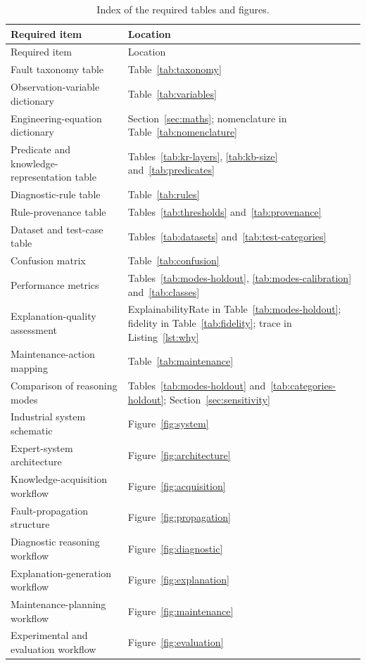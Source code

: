 \begin{small}
\begin{longtable}{L{5.6cm}L{8.4cm}}
  \caption{Index of the required tables and figures.}\label{tab:required}\\
  \toprule
  Required item & Location \\
  \midrule
  \endfirsthead
  \toprule
  Required item & Location \\
  \midrule
  \endhead
  Fault taxonomy table & Table~\ref{tab:taxonomy} \\
  Observation-variable dictionary & Table~\ref{tab:variables} \\
  Engineering-equation dictionary & Section~\ref{sec:maths}; nomenclature in Table~\ref{tab:nomenclature} \\
  Predicate and knowledge-representation table & Tables~\ref{tab:kr-layers}, \ref{tab:kb-size} and~\ref{tab:predicates} \\
  Diagnostic-rule table & Table~\ref{tab:rules} \\
  Rule-provenance table & Tables~\ref{tab:thresholds} and~\ref{tab:provenance} \\
  Dataset and test-case table & Tables~\ref{tab:datasets} and~\ref{tab:test-categories} \\
  Confusion matrix & Table~\ref{tab:confusion} \\
  Performance metrics & Tables~\ref{tab:modes-holdout}, \ref{tab:modes-calibration} and~\ref{tab:classes} \\
  Explanation-quality assessment & ExplainabilityRate in Table~\ref{tab:modes-holdout}; fidelity in Table~\ref{tab:fidelity}; trace in Listing~\ref{lst:why} \\
  Maintenance-action mapping & Table~\ref{tab:maintenance} \\
  Comparison of reasoning modes & Tables~\ref{tab:modes-holdout} and~\ref{tab:categories-holdout}; Section~\ref{sec:sensitivity} \\
  Industrial system schematic & Figure~\ref{fig:system} \\
  Expert-system architecture & Figure~\ref{fig:architecture} \\
  Knowledge-acquisition workflow & Figure~\ref{fig:acquisition} \\
  Fault-propagation structure & Figure~\ref{fig:propagation} \\
  Diagnostic reasoning workflow & Figure~\ref{fig:diagnostic} \\
  Explanation-generation workflow & Figure~\ref{fig:explanation} \\
  Maintenance-planning workflow & Figure~\ref{fig:maintenance} \\
  Experimental and evaluation workflow & Figure~\ref{fig:evaluation} \\
  \bottomrule
\end{longtable}
\end{small}

